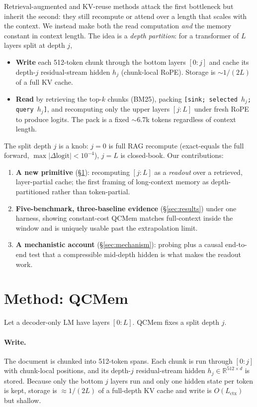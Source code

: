 \documentclass[11pt]{article}
\begin{document}
Retrieval-augmented and KV-reuse methods attack the first bottleneck but
inherit the second: they still recompute or attend over a length that scales
with the context. We instead make both the read computation \emph{and} the
memory constant in context length. The idea is a \emph{depth partition}: for a
transformer of $L$ layers split at depth $j$,
\begin{itemize}[leftmargin=1.2em,itemsep=1pt]
\item \textbf{Write} each 512-token chunk through the bottom layers $[0{:}j]$
and cache its depth-$j$ residual-stream hidden $h_j$ (chunk-local RoPE).
Storage is $\sim$$1/(2L)$ of a full KV cache.
\item \textbf{Read} by retrieving the top-$k$ chunks (BM25), packing
\texttt{[sink; selected $h_j$; query $h_j$]}, and recomputing only the upper
layers $[j{:}L]$ under fresh RoPE to produce logits. The pack is a fixed
$\sim$6.7k tokens regardless of context length.
\end{itemize}
The split depth $j$ is a knob: $j{=}0$ is full RAG recompute (exact-equals the
full forward, $\max|\Delta\text{logit}|<10^{-4}$), $j{=}L$ is closed-book. Our
contributions:
\begin{enumerate}[leftmargin=1.4em,itemsep=1pt]
\item \textbf{A new primitive} (\S\ref{sec:method}): recomputing $[j{:}L]$ as a
\emph{readout} over a retrieved, layer-partial cache; the first framing of
long-context memory as depth-partitioned rather than token-partial.
\item \textbf{Five-benchmark, three-baseline evidence} (\S\ref{sec:results})
under one harness, showing constant-cost QCMem matches full-context inside the
window and is uniquely usable past the extrapolation limit.
\item \textbf{A mechanistic account} (\S\ref{sec:mechanism}): probing plus a
causal end-to-end test that a compressible mid-depth hidden is what makes the
readout work.
\end{enumerate}

\section{Method: QCMem}
\label{sec:method}
Let a decoder-only LM have layers $[0{:}L]$. QCMem fixes a split depth $j$.

\paragraph{Write.} The document is chunked into 512-token spans. Each chunk is
run through $[0{:}j]$ with chunk-local positions, and its depth-$j$
residual-stream hidden $h_j\in\mathbb{R}^{512\times d}$ is stored. Because only
the bottom $j$ layers run and only one hidden state per token is kept, storage
is $\approx$$1/(2L)$ of a full-depth KV cache and write is $O(L_{\text{ctx}})$
but shallow.
\end{document}
